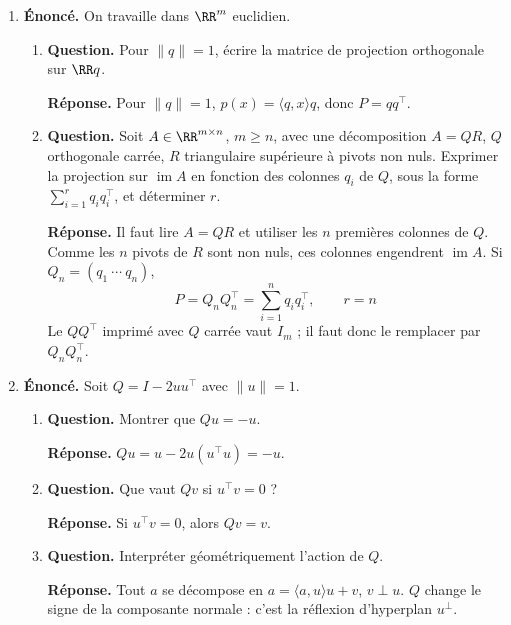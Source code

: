 \documentclass[12pt, a4paper]{article}
\begin{document}
\begin{enumerate}[label=8.\arabic*., start=70]
  \item \begin{minipage}[t]{\linewidth}\raggedright
\textbf{Énoncé.} On travaille dans $\RR^m$ euclidien.

\begin{enumerate}[\arabic*.]
        \item \textbf{Question.} Pour $\|q\|=1$, écrire la matrice de projection orthogonale sur $\RR q$.
\par\smallskip
\textbf{Réponse.} Pour $\|q\|=1$, $p(x)=\langle q,x\rangle q$, donc $P=qq^\top$.

  \item \textbf{Question.} Soit $A\in\RR^{m\times n}$, $m\geq n$, avec une décomposition $A=QR$, $Q$ orthogonale carrée, $R$ triangulaire supérieure à pivots non nuls. Exprimer la projection sur $\operatorname{im}A$ en fonction des colonnes $q_i$ de $Q$, sous la forme $\sum_{i=1}^r q_iq_i^\top$, et déterminer $r$.
\par\smallskip
\textbf{Réponse.} Il faut lire $A=QR$ et utiliser les $n$ premières colonnes de $Q$.
        Comme les $n$ pivots de $R$ sont non nuls, ces colonnes engendrent $\operatorname{im}A$.
        Si $Q_n=(q_1\ \cdots\ q_n)$,
        \[
          P=Q_nQ_n^\top=\sum_{i=1}^nq_iq_i^\top,\qquad r=n
        \]
        Le $QQ^\top$ imprimé avec $Q$ carrée vaut $I_m$ ; il faut donc le remplacer par $Q_nQ_n^\top$.

\end{enumerate}
\end{minipage}

  \item \begin{minipage}[t]{\linewidth}\raggedright
\textbf{Énoncé.} Soit $Q=I-2uu^\top$ avec $\|u\|=1$.

\begin{enumerate}[\arabic*.]
        \item \textbf{Question.} Montrer que $Qu=-u$.
\par\smallskip
\textbf{Réponse.} $Qu=u-2u(u^\top u)=-u$.

  \item \textbf{Question.} Que vaut $Qv$ si $u^\top v=0$ ?
\par\smallskip
\textbf{Réponse.} Si $u^\top v=0$, alors $Qv=v$.

  \item \textbf{Question.} Interpréter géométriquement l’action de $Q$.
\par\smallskip
\textbf{Réponse.} Tout $a$ se décompose en $a=\langle a,u\rangle u+v$, $v\perp u$.
        $Q$ change le signe de la composante normale : c'est la réflexion d'hyperplan $u^\perp$.


\end{enumerate}
\end{minipage}
\end{enumerate}
\end{document}
